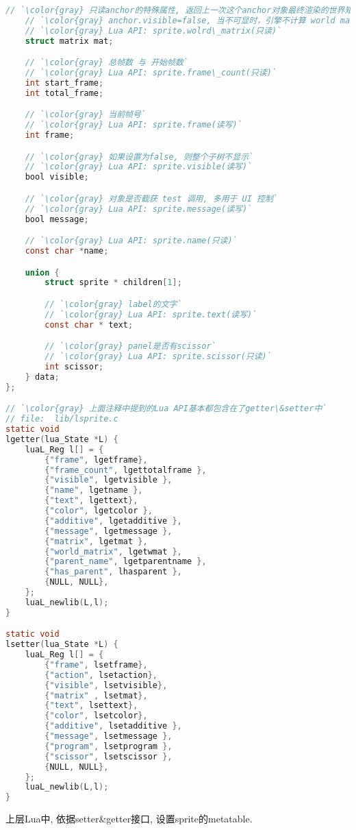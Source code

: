 {\begin{lstlisting}[language=C]
    // `\color{gray} 只读anchor的特殊属性, 返回上一次这个anchor对象最终渲染的世界矩阵`
    // `\color{gray} anchor.visible=false, 当不可显时，引擎不计算 world matrix`
    // `\color{gray} Lua API: sprite.wolrd\_matrix(只读)`
    struct matrix mat;

    // `\color{gray} 总帧数 与 开始帧数`
    // `\color{gray} Lua API: sprite.frame\_count(只读)`
    int start_frame;
    int total_frame;

    // `\color{gray} 当前帧号`
    // `\color{gray} Lua API: sprite.frame(读写)`
    int frame;

    // `\color{gray} 如果设置为false, 则整个子树不显示`
    // `\color{gray} Lua API: sprite.visible(读写)`
    bool visible;

    // `\color{gray} 对象是否截获 test 调用, 多用于 UI 控制`
    // `\color{gray} Lua API: sprite.message(读写)`
    bool message;

    // `\color{gray} Lua API: sprite.name(只读)`
    const char *name;

    union {
        struct sprite * children[1];

        // `\color{gray} label的文字`
        // `\color{gray} Lua API: sprite.text(读写)`
        const char * text;

        // `\color{gray} panel是否有scissor`
        // `\color{gray} Lua API: sprite.scissor(只读)`
        int scissor;
    } data;
};

// `\color{gray} 上面注释中提到的Lua API基本都包含在了getter\&setter中`
// file:  lib/lsprite.c
static void
lgetter(lua_State *L) {
	luaL_Reg l[] = {
		{"frame", lgetframe},
		{"frame_count", lgettotalframe },
		{"visible", lgetvisible },
		{"name", lgetname },
		{"text", lgettext},
		{"color", lgetcolor },
		{"additive", lgetadditive },
		{"message", lgetmessage },
		{"matrix", lgetmat },
		{"world_matrix", lgetwmat },
		{"parent_name", lgetparentname },
		{"has_parent", lhasparent },
		{NULL, NULL},
	};
	luaL_newlib(L,l);
}

static void
lsetter(lua_State *L) {
	luaL_Reg l[] = {
		{"frame", lsetframe},
		{"action", lsetaction},
		{"visible", lsetvisible},
		{"matrix" , lsetmat},
		{"text", lsettext},
		{"color", lsetcolor},
		{"additive", lsetadditive },
		{"message", lsetmessage },
		{"program", lsetprogram },
		{"scissor", lsetscissor },
		{NULL, NULL},
	};
	luaL_newlib(L,l);
}
\end{lstlisting}

    {上层Lua中, 依据setter\&getter接口, 设置sprite的metatable. }\par

}
